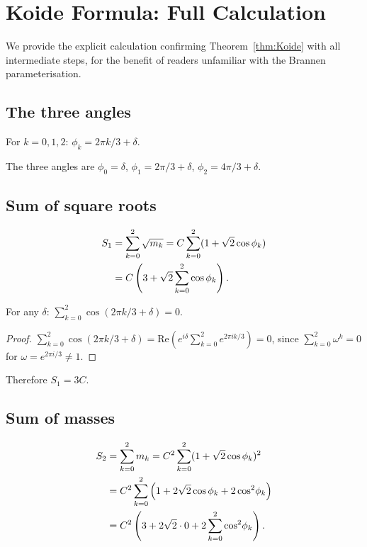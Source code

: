 \section{Koide Formula: Full Calculation}
\label{app:koide_full}

We provide the explicit calculation confirming Theorem~\ref{thm:Koide} with all
intermediate steps, for the benefit of readers unfamiliar with the Brannen
parameterisation.

\subsection{The three angles}

For $k = 0, 1, 2$: $\phi_k = 2\pi k / 3 + \delta$.

The three angles are $\phi_0 = \delta$, $\phi_1 = 2\pi/3 + \delta$, $\phi_2 = 4\pi/3 + \delta$.

\subsection{Sum of square roots}

\begin{align}
  S_1 &= \sum_{k=0}^2 \sqrt{m_k} = C \sum_{k=0}^2 (1 + \sqrt{2} \cos\phi_k) \notag \\
      &= C \left(3 + \sqrt{2} \sum_{k=0}^2 \cos\phi_k\right) .
\end{align}

\begin{lemma}
  For any $\delta$: $\sum_{k=0}^2 \cos(2\pi k/3 + \delta) = 0$.
\end{lemma}

\begin{proof}
  $\sum_{k=0}^2 \cos(2\pi k/3 + \delta) = \mathrm{Re}\left(e^{i\delta} \sum_{k=0}^2 e^{2\pi i k/3}\right) = 0$,
  since $\sum_{k=0}^2 \omega^k = 0$ for $\omega = e^{2\pi i/3} \neq 1$.
\end{proof}

Therefore $S_1 = 3C$.

\subsection{Sum of masses}

\begin{align}
  S_2 &= \sum_{k=0}^2 m_k = C^2 \sum_{k=0}^2 (1 + \sqrt{2}\cos\phi_k)^2 \notag \\
      &= C^2 \sum_{k=0}^2 \left(1 + 2\sqrt{2}\cos\phi_k + 2\cos^2\!\phi_k\right) \notag \\
      &= C^2 \left(3 + 2\sqrt{2} \cdot 0 + 2 \sum_{k=0}^2 \cos^2\!\phi_k\right) .
\end{align}

